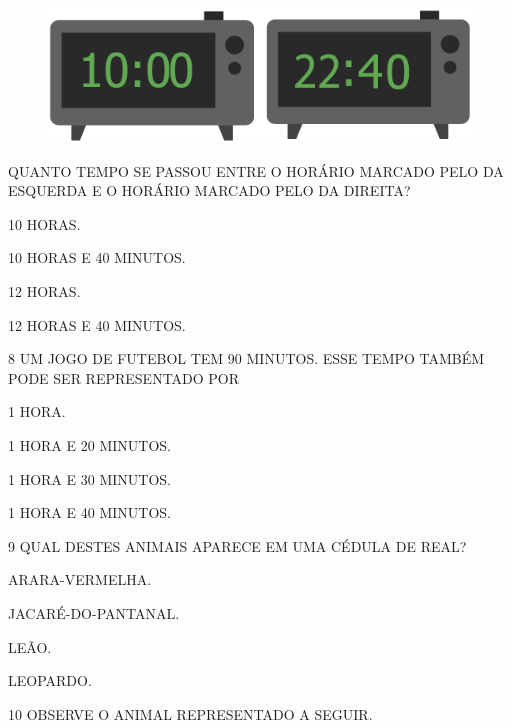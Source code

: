 \begin{figure}[htpb!]
\centering
\includegraphics[width=.3\textwidth]{./media/SAEB_1ANO_MAT_FIGURA139.png}
\end{figure}

QUANTO TEMPO SE PASSOU ENTRE O HORÁRIO MARCADO PELO DA ESQUERDA E O HORÁRIO MARCADO PELO DA DIREITA?

\begin{escolha}[itemsep=0pt]
\item 10 HORAS.

\item 10 HORAS E 40 MINUTOS.

\item 12 HORAS.

\item 12 HORAS E 40 MINUTOS.
\end{escolha}

\num{8} UM JOGO DE FUTEBOL TEM 90 MINUTOS. ESSE TEMPO TAMBÉM PODE SER
REPRESENTADO POR

\begin{escolha}[itemsep=0pt]
\item 1 HORA.

\item 1 HORA E 20 MINUTOS.

\item 1 HORA E 30 MINUTOS.

\item 1 HORA E 40 MINUTOS.
\end{escolha}

\pagebreak
\num{9} QUAL DESTES ANIMAIS APARECE EM UMA CÉDULA DE REAL?

\begin{escolha}[itemsep=0pt]
\item ARARA-VERMELHA.

\item JACARÉ-DO-PANTANAL.

\item LEÃO.

\item LEOPARDO.
\end{escolha}

\num{10} OBSERVE O ANIMAL REPRESENTADO A SEGUIR.

